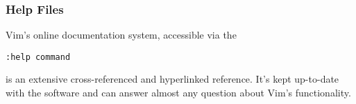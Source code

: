 \begin{frame}[fragile]
  \frametitle{Help Files}
  Vim's online documentation system, accessible via the
  \vspace{0.5cm}
  \begin{center}
    \texttt{:help command}
  \end{center}
  \vspace{0.45cm}
  is an extensive cross-referenced and hyperlinked reference. It's kept
  up-to-date with the software and can answer almost any question about Vim's
  functionality.
\end{frame}
